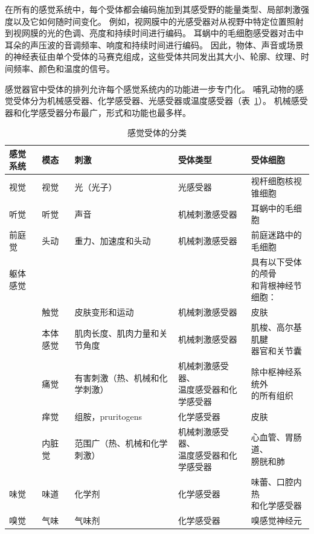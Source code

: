 在所有的感觉系统中，每个受体都会编码施加到其感受野的能量类型、局部刺激强度以及它如何随时间变化。
例如，视网膜中的光感受器对从视野中特定位置照射到视网膜的光的色调、亮度和持续时间进行编码。
耳蜗中的毛细胞感受器对击中耳朵的声压波的音调频率、响度和持续时间进行编码。
因此，物体、声音或场景的神经表征由单个受体的马赛克组成，这些受体共同发出其大小、轮廓、纹理、时间频率、颜色和温度的信号。


感觉器官中受体的排列允许每个感觉系统内的功能进一步专门化。 
哺乳动物的感觉受体分为机械感受器、化学感受器、光感受器或温度感受器（表~\ref{tab:17_1}）。
机械感受器和化学感受器分布最广，形式和功能也最多样。


\begin{table}[htbp]
	\centering
	\caption{感觉受体的分类}
	\begin{tabular}{lllll}
		\toprule
		感觉系统 & 模态 & 刺激 & 受体类型 & 受体细胞 \\
		\midrule
		视觉 & 视觉 & 光（光子）   & 光感受器 & 视杆细胞核视锥细胞\\
		听觉 & 听觉 & 声音   & 机械刺激感受器 & 耳蜗中的毛细胞 \\
		前庭觉 & 头动 & 重力、加速度和头动   & 机械刺激感受器 & 前庭迷路中的毛细胞 \\
		躯体感觉 &  &   &  & \makecell{具有以下受体的颅骨 \\ 和背根神经节细胞：} \\
		 & 触觉 & 皮肤变形和运动   & 机械刺激感受器 & 皮肤 \\
		 & 本体感觉 & 肌肉长度、肌肉力量和关节角度   & 机械刺激感受器 & \makecell{肌梭、高尔基肌腱 \\ 器官和关节囊}  \\
		 & 痛觉 & 有害刺激（热、机械和化学刺激）  & \makecell{机械刺激感受器、 \\ 温度感受器和化学感受器}  & \makecell{除中枢神经系统外 \\ 的所有组织}  \\
		 & 痒觉 & 组胺，pruritogens  & 化学感受器 & 皮肤 \\
		 & 内脏觉 & 范围广（热、机械和化学刺激）  & \makecell{机械刺激感受器、 \\ 温度感受器和化学感受器} & \makecell{心血管、胃肠道、 \\ 膀胱和肺}  \\
		味觉 & 味道 & 化学剂   & 化学感受器 & \makecell{味蕾、口腔内热 \\ 和化学感受器}  \\
		嗅觉 & 气味 & 气味剂   & 化学感受器 & 嗅感觉神经元 \\
		\bottomrule
	\end{tabular}%
	\label{tab:17_1}%
\end{table}%


